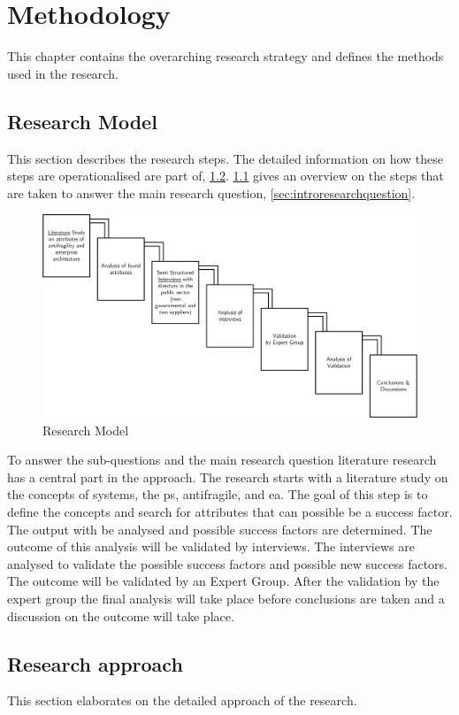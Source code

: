 \chapter{Methodology}
\label{ch:methodology}
This chapter contains the overarching research strategy and defines the methods used in the research.
\section{Research Model}
\label{sec:researchmodel}
This section describes the research steps. The detailed information on how these steps are operationalised are part of, \cref{sec:researchapproach}. \cref{fig:research-model} gives an overview on the steps that are taken to answer the main research question, \cref{sec:introresearchquestion}.
	\begin{figure}[H]
		\centering
		\includegraphics[width=14cm]{images/researchmodel}
		\caption[Research Model]{Research Model}
		\label{fig:research-model}
	\end{figure}
To answer the sub-questions and the main research question literature research has a central part in the approach. The research starts with a literature study on the concepts of systems, the \gls{ps}, \gls{antifragile}, and \acrfull{ea}. The goal of this step is to define the concepts and search for attributes that can possible be a success factor. The output with be analysed and possible success factors are determined. The outcome of this analysis will be validated by interviews. The interviews are analysed to validate the possible success factors and possible new success factors. The outcome will be validated by an Expert Group. After the validation by the expert group the final analysis will take place before conclusions are taken and a discussion on the outcome will take place.
\section{Research approach}
\label{sec:researchapproach}
This section elaborates on the detailed approach of the research.
